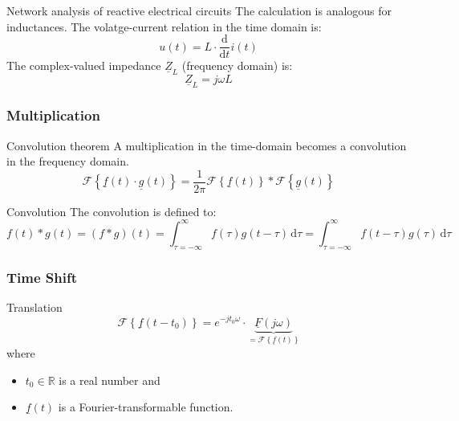 \begin{refsection}
\begin{excursus}{Network analysis of reactive electrical circuits}
	The calculation is analogous for inductances. The volatge-current relation in the time domain is:
	\begin{equation}
		u(t) = L \cdot \frac{\mathrm{d}}{\mathrm{d} t} i(t)
	\end{equation}
	The complex-valued impedance $\underline{Z}_L$ (frequency domain) is:
	\begin{equation}
		\underline{Z}_L = j \omega L
	\end{equation}
\end{excursus}

\subsubsection{Multiplication}

\begin{definition}{Convolution theorem}
	A multiplication in the time-domain becomes a convolution in the frequency domain.
	\begin{equation}
		\mathcal{F}\left\{ \underline{f}(t) \cdot \underline{g}(t) \right\} = \frac{1}{2 \pi} \mathcal{F}\left\{\underline{f}(t)\right\} * \mathcal{F}\left\{\underline{g}(t)\right\}
		\label{eq:ch02:op_mult}
	\end{equation}
\end{definition}

\begin{excursus}{Convolution}
	The convolution is defined to:
	\begin{equation}
		f(t) * g(t) = \left(f * g\right) (t) = \int_{\tau = -\infty}^{\infty} f(\tau) g(t - \tau) \, \mathrm{d} \tau  = \int_{\tau = -\infty}^{\infty} f(t - \tau) g(\tau) \, \mathrm{d} \tau
		\label{eq:ch02:def_convolution}
	\end{equation}
\end{excursus}

\subsubsection{Time Shift}


\begin{definition}{Translation}
	\begin{equation}
		\mathcal{F}\left\{\underline{f}(t - t_0)\right\} = e^{-j t_0 \omega} \cdot \underbrace{\underline{F} \left(j \omega\right)}_{= \mathcal{F}\left\{\underline{f}(t)\right\}}
		\label{eq:ch02:op_time_shift}
	\end{equation}
	where
	\begin{itemize}
		\item $t_0 \in \mathbb{R}$ is a real number and
		\item $\underline{f}(t)$ is a Fourier-transformable function.
	\end{itemize}
\end{definition}


\end{refsection}

